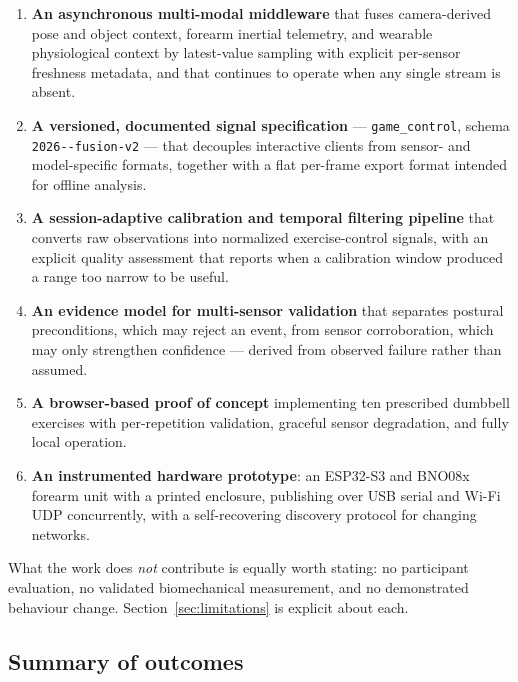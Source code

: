 \documentclass[11pt,a4paper]{article}
\newcommand{\code}[1]{\texttt{\small #1}}
\begin{document}
\begin{enumerate}
\item \textbf{An asynchronous multi-modal middleware} that fuses camera-derived
pose and object context, forearm inertial telemetry, and wearable physiological
context by latest-value sampling with explicit per-sensor freshness metadata,
and that continues to operate when any single stream is absent.

\item \textbf{A versioned, documented signal specification} --- \code{game\_control},
schema \code{2026--\allowbreak fusion-\allowbreak v2} --- that
decouples interactive clients from sensor- and model-specific formats, together
with a flat per-frame export format intended for offline analysis.

\item \textbf{A session-adaptive calibration and temporal filtering pipeline}
that converts raw observations into normalized exercise-control signals, with
an explicit quality assessment that reports when a calibration window produced
a range too narrow to be useful.

\item \textbf{An evidence model for multi-sensor validation} that separates
postural preconditions, which may reject an event, from sensor corroboration,
which may only strengthen confidence --- derived from observed failure rather
than assumed.

\item \textbf{A browser-based proof of concept} implementing ten prescribed
dumbbell exercises with per-repetition validation, graceful sensor degradation,
and fully local operation.

\item \textbf{An instrumented hardware prototype}: an ESP32-S3 and BNO08x
forearm unit with a printed enclosure, publishing over USB serial and Wi-Fi UDP
concurrently, with a self-recovering discovery protocol for changing networks.
\end{enumerate}

What the work does \emph{not} contribute is equally worth stating: no
participant evaluation, no validated biomechanical measurement, and no
demonstrated behaviour change. Section~\ref{sec:limitations} is explicit about
each.

\subsection{Summary of outcomes}
\end{document}
